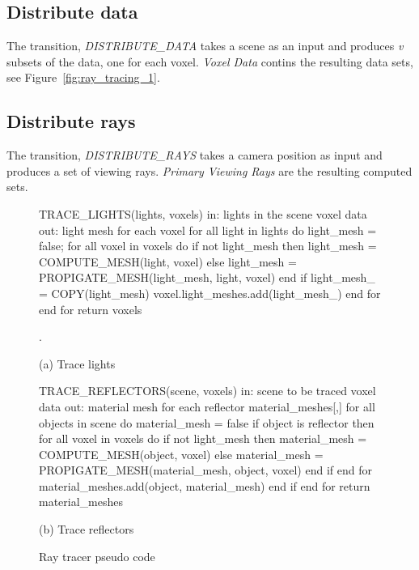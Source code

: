 \subsection{Distribute data}
The transition, \emph{DISTRIBUTE\_DATA} takes a scene as an input and produces 
\emph{v} subsets of the data, one for each voxel.  \emph{Voxel Data} contins the
resulting data sets, see Figure~\ref{fig:ray_tracing_1}.

\subsection{Distribute rays}
The transition, \emph{DISTRIBUTE\_RAYS} takes a camera position as input and
produces a set of viewing rays.  \emph{Primary Viewing Rays} are the resulting 
computed sets.

\begin{figure}[!htb]
\begin{algorithm}
TRACE_LIGHTS(lights, voxels) 
  in:  lights in the scene
       voxel data
  out: light mesh for each voxel
  for all light in lights do
    light_mesh = false;
    for all voxel in voxels do 
      if not light_mesh then
        light_mesh = 
          COMPUTE_MESH(light, voxel)
      else
        light_mesh = 
          PROPIGATE_MESH(light_mesh, 
                       light, voxel)
      end if
      light_mesh_ = COPY(light_mesh)
      voxel.light_meshes.add(light_mesh_)
    end for
  end for
return voxels


.
\end{algorithm}

(a) Trace lights

\endminipage\hfill
{}
\begin{algorithm}
TRACE_REFLECTORS(scene, voxels) 
  in:  scene to be traced
       voxel data
  out: material mesh for each reflector
  material_meshes[,]
  for all objects in scene do
    material_mesh = false
    if object is reflector then
      for all voxel in voxels do 
        if not light_mesh then
          material_mesh = 
            COMPUTE_MESH(object, voxel)
        else
          material_mesh = 
            PROPIGATE_MESH(material_mesh, 
                         object, voxel)
        end if
      end for
      material_meshes.add(object, 
                         material_mesh)
    end if
  end for
return material_meshes
\end{algorithm}

(b) Trace reflectors

\endminipage\hfill
\caption{Ray tracer pseudo code}
\label{fig:ray_tracing_2}
\end{figure}

